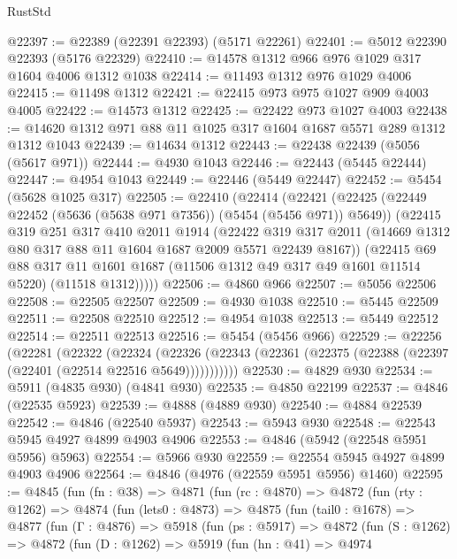 \begin{lexlean}{RustStd}
\begin{coremodule}
@22397 := @22389 (@22391 @22393) (@5171 @22261)
@22401 := @5012 @22390 @22393 (@5176 @22329)
@22410 := @14578 @1312 @966 @976 @1029 @317 @1604 @4006 @1312 @1038
@22414 := @11493 @1312 @976 @1029 @4006
@22415 := @11498 @1312
@22421 := @22415 @973 @975 @1027 @909 @4003 @4005
@22422 := @14573 @1312
@22425 := @22422 @973 @1027 @4003
@22438 := @14620 @1312 @971 @88 @11 @1025 @317 @1604 @1687 @5571 @289 @1312 @1312 @1043
@22439 := @14634 @1312
@22443 := @22438 @22439 (@5056 (@5617 @971))
@22444 := @4930 @1043
@22446 := @22443 (@5445 @22444)
@22447 := @4954 @1043
@22449 := @22446 (@5449 @22447)
@22452 := @5454 (@5628 @1025 @317)
@22505 := @22410
    (@22414
      (@22421
        (@22425 (@22449 @22452 (@5636 (@5638 @971 @7356)) (@5454 (@5456 @971)) @5649))
        (@22415
          @319
          @251
          @317
          @410
          @2011
          @1914
          (@22422
            @319
            @317
            @2011
            (@14669 @1312 @80 @317 @88 @11 @1604 @1687 @2009 @5571 @22439 @8167))
          (@22415
            @69
            @88
            @317
            @11
            @1601
            @1687
            (@11506 @1312 @49 @317 @49 @1601 @11514 @5220)
            (@11518 @1312)))))
@22506 := @4860 @966
@22507 := @5056 @22506
@22508 := @22505 @22507
@22509 := @4930 @1038
@22510 := @5445 @22509
@22511 := @22508 @22510
@22512 := @4954 @1038
@22513 := @5449 @22512
@22514 := @22511 @22513
@22516 := @5454 (@5456 @966)
@22529 := @22256
    (@22281
      (@22322
        (@22324
          (@22326 (@22343 (@22361 (@22375 (@22388 (@22397 (@22401 (@22514 @22516 @5649)))))))))))
@22530 := @4829 @930
@22534 := @5911 (@4835 @930) (@4841 @930)
@22535 := @4850 @22199
@22537 := @4846 (@22535 @5923)
@22539 := @4888 (@4889 @930)
@22540 := @4884 @22539
@22542 := @4846 (@22540 @5937)
@22543 := @5943 @930
@22548 := @22543 @5945 @4927 @4899 @4903 @4906
@22553 := @4846 (@5942 (@22548 @5951 @5956) @5963)
@22554 := @5966 @930
@22559 := @22554 @5945 @4927 @4899 @4903 @4906
@22564 := @4846 (@4976 (@22559 @5951 @5956) @1460)
@22595 := @4845
    (fun (fn : @38) =>
    @4871
      (fun (rc : @4870) =>
      @4872
        (fun (rty : @1262) =>
        @4874
          (fun (lets0 : @4873) =>
          @4875
            (fun (tail0 : @1678) =>
            @4877
              (fun (Γ : @4876) =>
              @5918
                (fun (ps : @5917) =>
                @4872
                  (fun (S : @1262) =>
                  @4872
                    (fun (D : @1262) =>
                    @5919
                      (fun (hn : @41) =>
                      @4974

\end{coremodule}
\end{lexlean}
